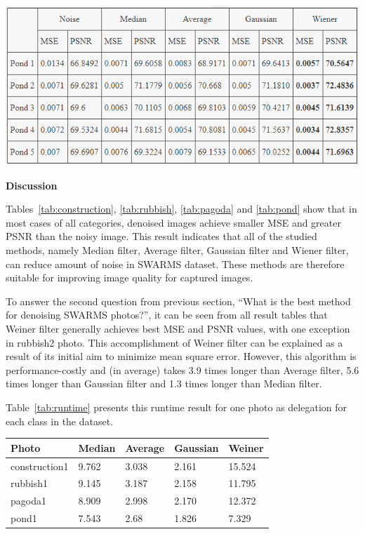 \begin{center}
\includegraphics[width=15cm]{images/Pond.png}
\label{tab:pond}
\end{center}

\newpage

\setlength{\parskip}{0.5em}
\setlength\parindent{24pt}

\textbf{Discussion}

Tables~\ref{tab:construction}, \ref{tab:rubbish}, \ref{tab:pagoda} and \ref{tab:pond} show that in most cases of all categories, denoised images achieve smaller MSE and greater PSNR than the noisy image. This result indicates that all of the studied methods, namely Median filter, Average filter, Gaussian filter and Wiener filter, can reduce amount of noise in SWARMS dataset. These methods are therefore suitable for improving image quality for captured images.

To answer the second question from previous section, ``What is the best method for denoising SWARMS photos?'', it can be seen from all result tables that Weiner filter generally achieves best MSE and PSNR values, with one exception in rubbish2 photo. This accomplishment of Weiner filter can be explained as a result of its initial aim to minimize mean square error. However, this algorithm is performance-costly and (in average) takes 3.9 times longer than Average filter, 5.6 times longer than Gaussian filter and 1.3 times longer than Median filter.

Table~\ref{tab:runtime} presents this runtime result for one photo as delegation for each class in the dataset.

\begin{center}
	\begin{tabular}{| l | l | l | l | l |}
		\hline
		Photo 			& Median 	& Average 	& Gaussian 	& Weiner 	\\ \hline
		construction1	& 9.762		& 3.038		& 2.161		& 15.524	\\ \hline
		rubbish1		& 9.145		& 3.187		& 2.158		& 11.795	\\ \hline
		pagoda1			& 8.909		& 2.998		& 2.170		& 12.372	\\ \hline
		pond1			& 7.543		& 2.68		& 1.826		& 7.329		\\ \hline
	\end{tabular}
	\label{tab:runtime}
\end{center}